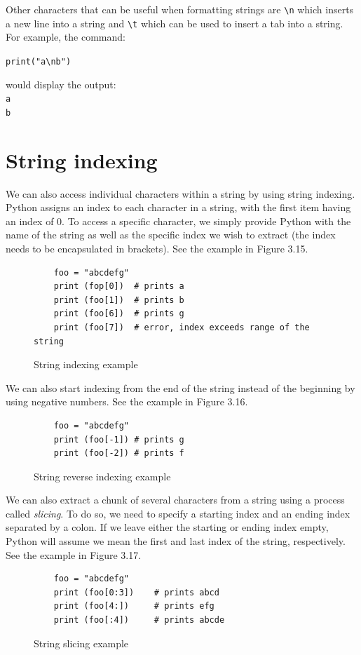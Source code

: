 \documentclass{book}
\begin{document}
Other characters that can be useful when formatting strings are \texttt{\textbackslash n} which inserts a new line into a string and \texttt{\textbackslash t} which can be used to insert a tab into a string. For example, the command:

\texttt{print("a\textbackslash nb")}

would display the output:\\
\texttt{a\\b}

\section{String indexing}
We can also access individual characters within a string by using string indexing. Python assigns an index to each character in a string, with the first item having an index of 0. To access a specific character, we simply provide Python with the name of the string as well as the specific index we wish to extract (the index needs to be encapsulated in brackets). See the example in Figure 3.15.

\begin{figure}[h]
	\caption{String indexing example}
	\begin{lstlisting}
	foo = "abcdefg"
	print (fop[0])	# prints a
	print (foo[1])	# prints b
	print (foo[6])	# prints g
	print (foo[7])	# error, index exceeds range of the string
	\end{lstlisting}
\end{figure}

We can also start indexing from the end of the string instead of the beginning by using negative numbers. See the example in Figure 3.16.

\begin{figure}[h]
	\caption{String reverse indexing example}
	\begin{lstlisting}
	foo = "abcdefg"
	print (foo[-1])	# prints g
	print (foo[-2])	# prints f
	\end{lstlisting}
\end{figure}

We can also extract a chunk of several characters from a string using a process called \textit{slicing}. To do so, we need to specify a starting index and an ending index separated by a colon. If we leave either the starting or ending index empty, Python will assume we mean the first and last index of the string, respectively. See the example in Figure 3.17.

\begin{figure}[h]
	\caption{String slicing example}
	\begin{lstlisting}
	foo = "abcdefg"
	print (foo[0:3])	# prints abcd
	print (foo[4:])		# prints efg
	print (foo[:4])		# prints abcde
	\end{lstlisting}
\end{figure}
\end{document}
